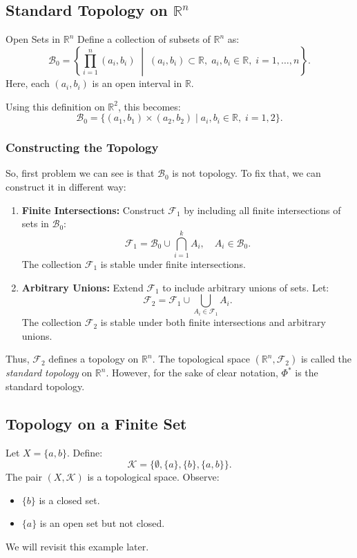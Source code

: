 \subsection{Standard Topology on $\mathbb{R}^n$}


\begin{defbox}{Open Sets in $\mathbb{R}^n$}
Define a collection of subsets of $\mathbb{R}^n$ as:
\[
\mathcal{B}_0 = \left\{ \prod_{i=1}^n (a_i, b_i) \;\middle|\; (a_i, b_i) \subset \mathbb{R}, \; a_i, b_i \in \mathbb{R}, \; i = 1, \dots, n \right\}.
\]
Here, each $(a_i, b_i)$ is an open interval in $\mathbb{R}$.
\end{defbox}
Using this definition on $\mathbb{R}^2$, this becomes:
\[
\mathcal{B}_0 = \{ (a_1, b_1) \times (a_2, b_2) \mid a_i, b_i \in \mathbb{R}, \; i = 1, 2 \}.
\]
\subsubsection{Constructing the Topology}
So, first problem we can see is that $\mathcal{B}_0$ is not topology. To fix that, we can construct it in different way:
\begin{enumerate}
    \item \textbf{Finite Intersections:}
    Construct $\mathcal{F}_1$ by including all finite intersections of sets in $\mathcal{B}_0$:
    \[
    \mathcal{F}_1 = \mathcal{B}_0 \cup \bigcap_{i=1}^k A_i, \quad A_i \in \mathcal{B}_0.
    \]
    The collection $\mathcal{F}_1$ is stable under finite intersections.

    \item \textbf{Arbitrary Unions:}
    Extend $\mathcal{F}_1$ to include arbitrary unions of sets. Let:
    \[
    \mathcal{F}_2 = \mathcal{F}_1 \cup \bigcup_{A_i \in \mathcal{F}_1} A_i.
    \]
    The collection $\mathcal{F}_2$ is stable under both finite intersections and arbitrary unions.
\end{enumerate}

Thus, $\mathcal{F}_2$ defines a topology on $\mathbb{R}^n$. The topological space $(\mathbb{R}^n, \mathcal{F}_2)$ is called the \textit{standard topology} on $\mathbb{R}^n$. However, for the sake of clear notation, $\Phi^*$ is the standard topology.

\subsection{Topology on a Finite Set}

Let $X = \{ a, b \}$. Define:
\[
\mathcal{K} = \{ \emptyset, \{ a \}, \{ b \}, \{ a, b \} \}.
\]
The pair $(X, \mathcal{K})$ is a topological space. Observe:
\begin{itemize}
    \item $\{ b \}$ is a closed set.
    \item $\{ a \}$ is an open set but not closed.
\end{itemize}
We will revisit this example later.
